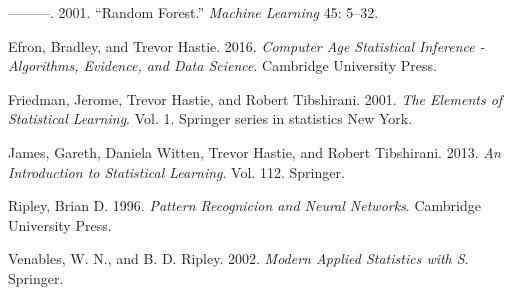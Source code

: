 \documentclass[]{article}
\begin{document}
\leavevmode\hypertarget{ref-RandomForest}{}%
---------. 2001. ``Random Forest.'' \emph{Machine Learning} 45: 5--32.

\leavevmode\hypertarget{ref-casi}{}%
Efron, Bradley, and Trevor Hastie. 2016. \emph{Computer Age Statistical
Inference - Algorithms, Evidence, and Data Science}. Cambridge
University Press.

\leavevmode\hypertarget{ref-ESL}{}%
Friedman, Jerome, Trevor Hastie, and Robert Tibshirani. 2001. \emph{The
Elements of Statistical Learning}. Vol. 1. Springer series in statistics
New York.

\leavevmode\hypertarget{ref-ISL}{}%
James, Gareth, Daniela Witten, Trevor Hastie, and Robert Tibshirani.
2013. \emph{An Introduction to Statistical Learning}. Vol. 112.
Springer.

\leavevmode\hypertarget{ref-Ripley}{}%
Ripley, Brian D. 1996. \emph{Pattern Recognicion and Neural Networks}.
Cambridge University Press.

\leavevmode\hypertarget{ref-MASS}{}%
Venables, W. N., and B. D. Ripley. 2002. \emph{Modern Applied Statistics
with S}. Springer.
\end{document}
